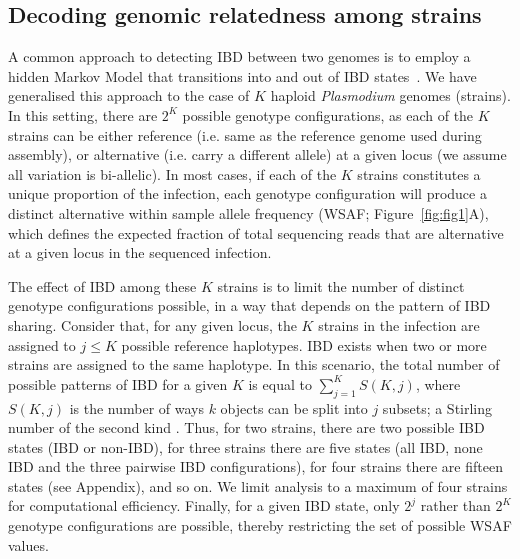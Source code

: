 \documentclass[9pt,lineno]{elife}
\begin{document}
\subsection{Decoding genomic relatedness among strains}

A common approach to detecting IBD between two genomes is to employ a hidden Markov Model that transitions into and out of IBD states~\citep{Chang2015, Gusev2009, Gusev2011}.  We have generalised this approach to the case of $K$ haploid {\it Plasmodium} genomes (strains). In this setting, there are $2^K$ possible genotype configurations, as each of the $K$ strains can be either reference (i.e. same as the reference genome used during assembly), or alternative (i.e. carry a different allele) at a given locus (we assume all variation is bi-allelic). In most cases, if each of the $K$ strains constitutes a unique proportion of the infection, each genotype configuration will produce a distinct alternative within sample allele frequency (WSAF; Figure~\ref{fig:fig1}A), which defines the expected fraction of total sequencing reads that are alternative at a given locus in the sequenced infection.

The effect of IBD among these $K$ strains is to limit the number of distinct genotype configurations possible, in a way that depends on the pattern of IBD sharing. Consider that, for any given locus, the $K$ strains in the infection are assigned to $j \leq K$ possible reference haplotypes. IBD exists when two or more strains are assigned to the same haplotype. In this scenario, the total number of possible patterns of IBD for a given $K$ is equal to $\sum_{j=1}^{K} S(K,j)$, where $S(K,j)$ is the number of ways $k$ objects can be split into $j$ subsets; a Stirling number of the second kind \citep{Ronald1988}. Thus, for two strains, there are two possible IBD states (IBD or non-IBD), for three strains there are five states (all IBD, none IBD and the three pairwise IBD configurations), for four strains there are fifteen states (see Appendix), and so on. We limit analysis to a maximum of four strains for computational efficiency. Finally, for a given IBD state, only $2^j$ rather than $2^K$ genotype configurations are possible, thereby restricting the set of possible WSAF values.
\end{document}
